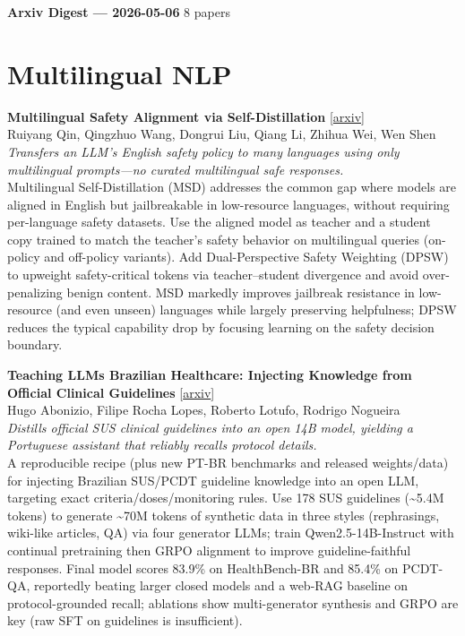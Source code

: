 \documentclass[12pt,letterpaper]{article}
\begin{document}
{\footnotesize\textbf{Arxiv Digest --- 2026-05-06} \hfill 8 papers}

\smallskip

\section*{Multilingual NLP}

{\small\textbf{Multilingual Safety Alignment via Self-Distillation}} {\scriptsize[\href{https://arxiv.org/abs/2605.02971}{arxiv}]}\\
{\scriptsize Ruiyang Qin, Qingzhuo Wang, Dongrui Liu, Qiang Li, Zhihua Wei, Wen Shen}\\

{\small\textit{Transfers an LLM's English safety policy to many languages using only multilingual prompts---no curated multilingual safe responses.}}\\[1pt]
{\footnotesize Multilingual Self-Distillation (MSD) addresses the common gap where models are aligned in English but jailbreakable in low-resource languages, without requiring per-language safety datasets. Use the aligned model as teacher and a student copy trained to match the teacher's safety behavior on multilingual queries (on-policy and off-policy variants). Add Dual-Perspective Safety Weighting (DPSW) to upweight safety-critical tokens via teacher--student divergence and avoid over-penalizing benign content. MSD markedly improves jailbreak resistance in low-resource (and even unseen) languages while largely preserving helpfulness; DPSW reduces the typical capability drop by focusing learning on the safety decision boundary.}

\medskip

{\small\textbf{Teaching LLMs Brazilian Healthcare: Injecting Knowledge from Official Clinical Guidelines}} {\scriptsize[\href{https://arxiv.org/abs/2605.01077}{arxiv}]}\\
{\scriptsize Hugo Abonizio, Filipe Rocha Lopes, Roberto Lotufo, Rodrigo Nogueira}\\

{\small\textit{Distills official SUS clinical guidelines into an open 14B model, yielding a Portuguese assistant that reliably recalls protocol details.}}\\[1pt]
{\footnotesize A reproducible recipe (plus new PT-BR benchmarks and released weights/data) for injecting Brazilian SUS/PCDT guideline knowledge into an open LLM, targeting exact criteria/doses/monitoring rules. Use 178 SUS guidelines (\textasciitilde{}5.4M tokens) to generate \textasciitilde{}70M tokens of synthetic data in three styles (rephrasings, wiki-like articles, QA) via four generator LLMs; train Qwen2.5-14B-Instruct with continual pretraining then GRPO alignment to improve guideline-faithful responses. Final model scores 83.9\% on HealthBench-BR and 85.4\% on PCDT-QA, reportedly beating larger closed models and a web-RAG baseline on protocol-grounded recall; ablations show multi-generator synthesis and GRPO are key (raw SFT on guidelines is insufficient).}
\end{document}
